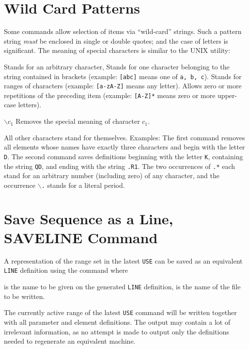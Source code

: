 \section{Wild Card Patterns}
\label{S-WILD}
Some commands allow selection of items via ``wild-card'' strings.
Such a pattern string {\em must} be enclosed in single or double quotes;
and the case of letters is significant.
The meaning of special characters is similar to the UNIX 
utility:
\begin{mylist}
Stands for an arbitrary character,
\ttitem{[\(c_1c_2c_3...\)]}
Stands for one character belonging to the string contained in brackets
(example: {\tt [abc]} means one of {\tt a, b, c}).
\ttitem{[\(c_1-c_2c_3-c_4...\)]}
Stands for ranges of characters
(example: {\tt [a-zA-Z]} means any letter).
\ttitem{*}
Allows zero or more repetitions of the preceding item
(example: {\tt [A-Z]*} means zero or more upper-case letters).
\item[\(\backslash c_1\)]
Removes the special meaning of character \(c_1\).
\end{mylist}
All other characters stand for themselves.
Examples:
The first command removes all elements whose names have exactly three
characters and begin with the letter {\tt D}.
The second command saves definitions beginning with the letter {\tt K},
containing the string {\tt QD}, and ending with the string {\tt .R1}.
The two occurrences of {\tt .*} each stand for an arbitrary
number (including zero) of any character,
and the occurrence {\tt \(\backslash\).} stands for a literal period.
 
\section{Save Sequence as a Line, SAVELINE Command}
A representation of the range set in the latest {\tt USE} can
be saved as an equivalent {\tt LINE} definition using the command
where
\begin{mylist}
is the name to be given on the generated {\tt LINE} definition,
is the name of the file to be written.
\end{mylist}
The currently active range of the latest {\tt USE} command will be
written together with all parameter and element definitions.
The output may contain a lot of irrelevant information,
as no attempt is made to output only the definitions needed to
regenerate an equivalent machine.
 
